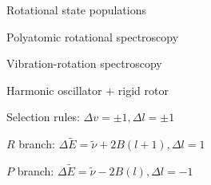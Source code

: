 \documentclass[11pt]{article}
\begin{document}
\begin{outline}
\begin{outline}
\begin{outline}
    \item Rotational state populations
    \end{outline}
  \item{Polyatomic rotational spectroscopy}
  \item{Vibration-rotation spectroscopy}
    \begin{outline}
    \item Harmonic oscillator + rigid rotor
    \item Selection rules: $\Delta v = \pm 1, \Delta l=\pm 1$
    \item $R$ branch: $\Delta \tilde E  = \tilde \nu + 2B(l+1), \Delta l = 1$ 
    \item $P$ branch: $\Delta \tilde E = \tilde \nu - 2B(l), \Delta l = -1$       
    \end{outline}


\end{outline}
\end{outline}
\end{document}
